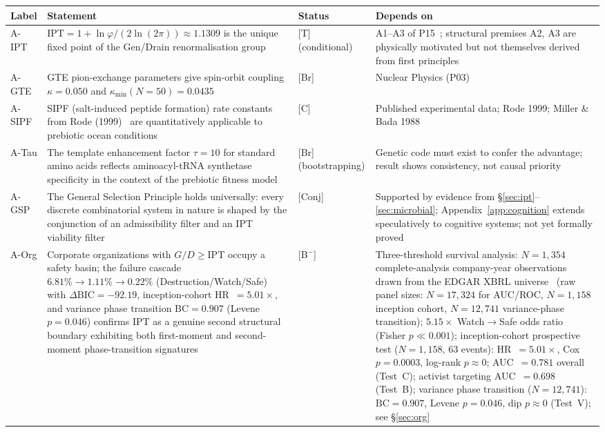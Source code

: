 \documentclass[11pt]{article}
\theoremstyle{remark}
\newcommand{\IPT}{\mathrm{IPT}}
\begin{document}
\renewcommand{\arraystretch}{1.25}
\begin{longtable}{@{}p{}p{}p{}p{}@{}}
\toprule
\textbf{Label} & \textbf{Statement} & \textbf{Status} & \textbf{Depends on} \\
\midrule
\endhead
\bottomrule
\endfoot
A-IPT &
  $\IPT = 1 + \ln\varphi/(2\ln(2\pi)) \approx 1.1309$ is the unique fixed point of
  the Gen/Drain renormalisation group &
  [T] (conditional) &
  A1--A3 of P15~\cite{SpivackIPT}; structural premises A2, A3 are physically
  motivated but not themselves derived from first principles \\

A-GTE &
  GTE pion-exchange parameters give spin-orbit coupling $\kappa = 0.050$
  and $\kappa_\mathrm{min}(N{=}50) = 0.0435$ &
  [Br] &
  Nuclear Physics (P03)~\cite{spivack2025nuclear_physics} \\

A-SIPF &
  SIPF (salt-induced peptide formation) rate constants from Rode (1999)~\cite{Rode1999}
  are quantitatively applicable to prebiotic ocean conditions &
  [C] &
  Published experimental data; Rode 1999; Miller \& Bada 1988 \\

A-Tau &
  The template enhancement factor $\tau = 10$ for standard amino acids
  reflects aminoacyl-tRNA synthetase specificity in the context of the
  prebiotic fitness model &
  [Br] (bootstrapping) &
  Genetic code must exist to confer the advantage; result shows consistency,
  not causal priority \\

A-GSP &
  The General Selection Principle holds universally: every discrete
  combinatorial system in nature is shaped by the conjunction of an
  admissibility filter and an IPT viability filter &
  [Conj] &
  Supported by evidence from §\ref{sec:ipt}--\ref{sec:microbial};
  Appendix~\ref{app:cognition} extends speculatively to cognitive systems;
  not yet formally proved \\

A-Org &
  Corporate organizations with $G/D \geq \IPT$ occupy a safety basin;
  the failure cascade $6.81\%\to 1.11\%\to 0.22\%$ (Destruction/Watch/Safe)
  with $\Delta\mathrm{BIC}=-92.19$, inception-cohort HR~$=5.01\times$,
  and variance phase transition $\mathrm{BC}=0.907$ (Levene $p=0.046$)
  confirms IPT as a genuine second structural boundary exhibiting both
  first-moment and second-moment phase-transition signatures &
  [B$^-$] &
  Three-threshold survival analysis: $N=1{,}354$ complete-analysis company-year
  observations drawn from the EDGAR XBRL universe~\cite{SECEDGAR} (raw panel sizes:
  $N=17{,}324$ for AUC/ROC, $N=1{,}158$ inception cohort, $N=12{,}741$ variance-phase transition);
  $5.15\times$ Watch$\to$Safe odds ratio (Fisher $p\ll 0.001$);
  inception-cohort prospective test ($N=1{,}158$, 63 events):
  HR~$=5.01\times$, Cox $p=0.0003$, log-rank $p\approx 0$;
  AUC~$=0.781$ overall (Test~C);
  activist targeting AUC~$=0.698$ (Test~B);
  variance phase transition ($N=12{,}741$):
  $\mathrm{BC}=0.907$, Levene $p=0.046$, dip $p\approx 0$ (Test~V);
  see §\ref{sec:org} \\


\end{longtable}
\end{document}
